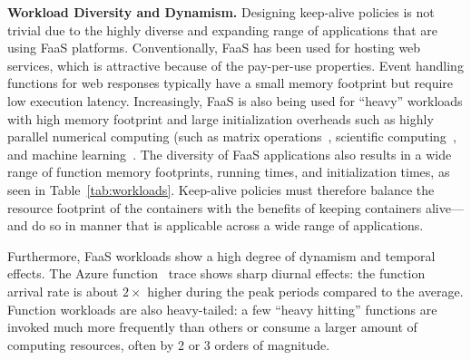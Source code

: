 \noindent \textbf{Workload Diversity and Dynamism.}
%
Designing keep-alive policies is not trivial due to the highly diverse and expanding range of applications that are using FaaS platforms.
Conventionally, FaaS has been used for hosting web services, which is attractive because of the pay-per-use properties. 
Event handling functions for web responses typically have a small memory footprint but require low execution latency. 
Increasingly, FaaS is also being used for ``heavy'' workloads with high memory footprint and large initialization overheads such as highly parallel numerical computing (such as matrix operations~\cite{jonas2017occupy}, scientific computing~\cite{shankar2018numpywren}, and machine learning~\cite{akkus_sand_2018}. 
The diversity of FaaS applications also results in a wide range of function memory footprints, running times, and initialization times, as seen in Table~\ref{tab:workloads}.  
Keep-alive policies must therefore balance the resource footprint of the containers with the benefits of keeping containers alive---and do so in manner that is applicable across a wide range of applications. 


Furthermore, FaaS workloads show a high degree of dynamism and temporal effects. 
The Azure function~\cite{shahrad_serverless_2020} trace shows sharp diurnal effects: the function arrival rate is about $2\times$ higher during the peak periods compared to the average. 
Function workloads are also heavy-tailed: a few ``heavy hitting'' functions are invoked much more frequently than others or consume a larger amount of computing resources, often by 2 or 3 orders of magnitude. 


